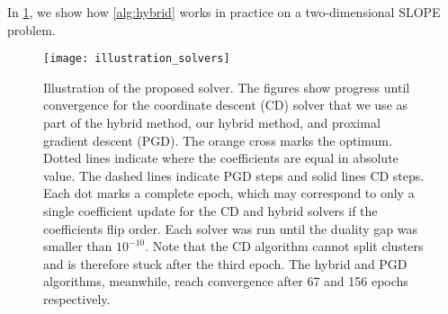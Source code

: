 In \cref{fig:illustration-solver}, we show how \cref{alg:hybrid} works in practice on
a two-dimensional SLOPE problem.

\begin{figure}[htbp]
  \centering
  \texttt{[image: illustration\_solvers]}
  \caption{Illustration of the proposed solver. The figures show progress
    until convergence for the coordinate descent (CD) solver that we use as part
    of the hybrid method, our hybrid method, and  proximal gradient descent
    (PGD). The orange cross marks the optimum. Dotted lines indicate where the
    coefficients are equal in absolute value. The dashed lines indicate PGD
    steps and solid lines CD steps. Each dot marks a complete epoch, which may
    correspond to only a single coefficient update for the CD and hybrid
    solvers if the coefficients flip order. Each solver was run until the duality
    gap was smaller than \(10^{-10}\). Note that the CD algorithm cannot split clusters
    and is therefore stuck after the third epoch. The hybrid and PGD algorithms,
    meanwhile, reach convergence after 67 and 156 epochs respectively.}
  \label{fig:illustration-solver}
\end{figure}

